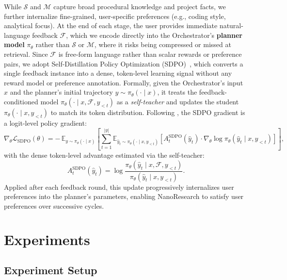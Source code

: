 \documentclass{opendatalab}
\begin{document}
While $\mathcal{S}$ and $\mathcal{M}$ capture broad procedural knowledge and project facts, we further internalize fine-grained, user-specific preferences (e.g., coding style, analytical focus). At the end of each stage, the user provides immediate natural-language feedback $\mathcal{F}$, which we encode directly into the Orchestrator's \textbf{planner model} $\pi_\theta$ rather than $\mathcal{S}$ or $\mathcal{M}$, where it risks being compressed or missed at retrieval. Since $\mathcal{F}$ is free-form language rather than scalar rewards or preference pairs, we adopt Self-Distillation Policy Optimization (SDPO)~\cite{buening2026aligning}, which converts a single feedback instance into a dense, token-level learning signal without any reward model or preference annotation. Formally, given the Orchestrator's input $x$ and the planner's initial trajectory $y \sim \pi_\theta(\cdot \mid x)$, it treats the feedback-conditioned model $\pi_\theta(\cdot \mid x, \mathcal{F}, y_{<t})$ as a \textit{self-teacher} and updates the student $\pi_\theta(\cdot \mid x, y_{<t})$ to match its token distribution. Following \cite{buening2026aligning}, the SDPO gradient is a logit-level policy gradient:
\begin{equation}
\nabla_\theta \mathcal{L}_{\text{SDPO}}(\theta) = -\,\mathbb{E}_{y \sim \pi_\theta(\cdot \mid x)} \left[ \sum_{t=1}^{|y|} \mathbb{E}_{\hat{y}_t \sim \pi_\theta(\cdot \mid x, y_{<t})} \left[ A^{\text{SDPO}}_{t}(\hat{y}_t) \cdot \nabla_\theta \log \pi_\theta(\hat{y}_t \mid x, y_{<t}) \right] \right],
\end{equation}
with the dense token-level advantage estimated via the self-teacher:
\begin{equation}
    A^{\text{SDPO}}_{t}(\hat{y}_t) = \log \frac{\pi_\theta(\hat{y}_t \mid x, \mathcal{F}, y_{<t})}{\pi_\theta(\hat{y}_t \mid x, y_{<t})}.
\end{equation}
Applied after each feedback round, this update progressively internalizes user preferences into the planner's parameters, enabling NanoResearch to satisfy user preferences over successive cycles.

\section{Experiments}
\subsection{Experiment Setup}
\end{document}
